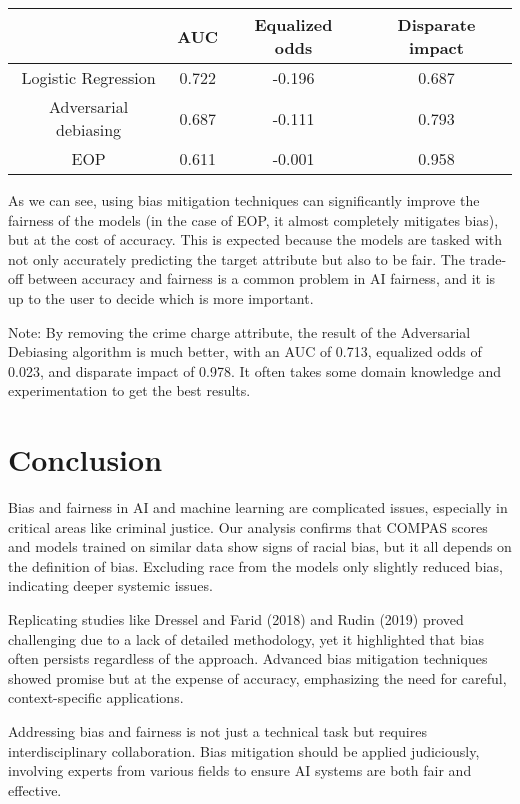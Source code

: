 \documentclass[sigconf,nonacm]{acmart}
\begin{document}
\begin{table}[h]
 \centering
 \begin{tabular}{|c|c|c|c|}
 \hline
 & AUC & Equalized odds & Disparate impact \\
 \hline
 Logistic Regression
 & 0.722 & -0.196 & 0.687 \\
 Adversarial
 debiasing
 & 0.687 & -0.111 & 0.793 \\
 EOP
 & 0.611 & -0.001 & 0.958 \\
 \hline
 \end{tabular}
 \label{tab:my_label}
\end{table}

As we can see, using bias mitigation techniques can significantly improve the fairness of the models (in the case of EOP, it almost completely mitigates bias), but at the cost of accuracy. This is expected because the models are tasked with not only accurately predicting the target attribute but also to be fair. The trade-off between accuracy and fairness is a common problem in AI fairness, and it is up to the user to decide which is more important.

Note: By removing the crime charge attribute, the result of the Adversarial Debiasing algorithm is much better, with an AUC of 0.713, equalized odds of 0.023, and disparate impact of 0.978. It often takes some domain knowledge and experimentation to get the best results.

\section{Conclusion}

Bias and fairness in AI and machine learning are complicated issues, especially in critical areas like criminal justice. Our analysis confirms that COMPAS scores and models trained on similar data show signs of racial bias, but it all depends on the definition of bias. Excluding race from the models only slightly reduced bias, indicating deeper systemic issues.

Replicating studies like Dressel and Farid (2018) and Rudin (2019) proved challenging due to a lack of detailed methodology, yet it highlighted that bias often persists regardless of the approach. Advanced bias mitigation techniques showed promise but at the expense of accuracy, emphasizing the need for careful, context-specific applications.

Addressing bias and fairness is not just a technical task but requires interdisciplinary collaboration. Bias mitigation should be applied judiciously, involving experts from various fields to ensure AI systems are both fair and effective.




\end{document}
